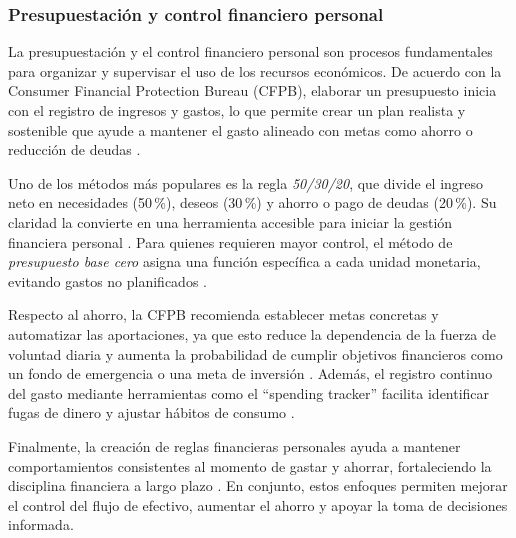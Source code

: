 \subsubsection{Presupuestación y control financiero personal}

La presupuestación y el control financiero personal son procesos fundamentales para organizar y supervisar el uso de los recursos económicos. De acuerdo con la Consumer Financial Protection Bureau (CFPB), elaborar un presupuesto inicia con el registro de ingresos y gastos, lo que permite crear un plan realista y sostenible que ayude a mantener el gasto alineado con metas como ahorro o reducción de deudas \cite{CFPB_Budgeting}. 

Uno de los métodos más populares es la regla \emph{50/30/20}, que divide el ingreso neto en necesidades (50\,\%), deseos (30\,\%) y ahorro o pago de deudas (20\,\%). Su claridad la convierte en una herramienta accesible para iniciar la gestión financiera personal \cite{Britannica_503020}. Para quienes requieren mayor control, el método de \emph{presupuesto base cero} asigna una función específica a cada unidad monetaria, evitando gastos no planificados \cite{Investopedia_ZBB}.

Respecto al ahorro, la CFPB recomienda establecer metas concretas y automatizar las aportaciones, ya que esto reduce la dependencia de la fuerza de voluntad diaria y aumenta la probabilidad de cumplir objetivos financieros como un fondo de emergencia o una meta de inversión \cite{CFPB_AutomaticSaving}. Además, el registro continuo del gasto mediante herramientas como el ``spending tracker'' facilita identificar fugas de dinero y ajustar hábitos de consumo \cite{CFPB_SpendingTracker}.

Finalmente, la creación de reglas financieras personales ayuda a mantener comportamientos consistentes al momento de gastar y ahorrar, fortaleciendo la disciplina financiera a largo plazo \cite{CFPB_MoneyRules}. En conjunto, estos enfoques permiten mejorar el control del flujo de efectivo, aumentar el ahorro y apoyar la toma de decisiones informada.
  

